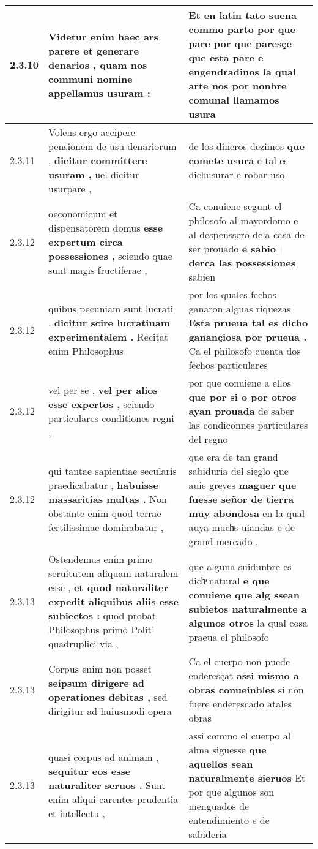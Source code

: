 \begin{tabular}{|p{1cm}|p{6.5cm}|p{6.5cm}|}
2.3.10 & Videtur enim haec ars parere \textbf{ et generare denarios , } quam nos communi nomine appellamus usuram : & Et en latin tato suena commo parto \textbf{ por que pare por que paresçe que esta pare e engendradinos la qual arte nos } por nonbre comunal llamamos usura \\\hline
2.3.11 & Volens ergo accipere pensionem de usu denariorum , \textbf{ dicitur committere usuram , } uel dicitur usurpare , & de los dineros dezimos \textbf{ que comete usura } e tal es dichusurar e robar uso \\\hline
2.3.12 & oeconomicum et dispensatorem domus \textbf{ esse expertum circa possessiones , } sciendo quae sunt magis fructiferae , & Ca conuiene segunt el philosofo al mayordomo e al despenssero dela casa de ser prouado \textbf{ e sabio | derca las possessiones } sabien \\\hline
2.3.12 & quibus pecuniam sunt lucrati , \textbf{ dicitur scire lucratiuam experimentalem . } Recitat enim Philosophus & por los quales fechos ganaron alguas riquezas \textbf{ Esta prueua tal es dicho ganançiosa por prueua . } Ca el philosofo cuenta dos fechos particulares \\\hline
2.3.12 & vel per se , \textbf{ vel per alios esse expertos , } sciendo particulares conditiones regni , & por que conuiene a ellos \textbf{ que por si o por otros ayan prouada } de saber las condiconnes particulares del regno \\\hline
2.3.12 & qui tantae sapientiae secularis praedicabatur , \textbf{ habuisse massaritias multas . } Non obstante enim quod terrae fertilissimae dominabatur , & que era de tan grand sabiduria del sieglo que auie greyes \textbf{ maguer que fuesse señor de tierra muy abondosa } en la qual auya muchͣs uiandas e de grand mercado . \\\hline
2.3.13 & Ostendemus enim primo seruitutem aliquam naturalem esse , \textbf{ et quod naturaliter expedit aliquibus aliis esse subiectos : } quod probat Philosophus primo Polit’ quadruplici via , & que alguna suidunbre es dichͣ natural \textbf{ e que conuiene que alg ssean subietos naturalmente a algunos otros } la qual cosa praeua el philosofo \\\hline
2.3.13 & Corpus enim non posset \textbf{ seipsum dirigere ad operationes debitas , } sed dirigitur ad huiusmodi opera & Ca el cuerpo non puede enderesçat \textbf{ assi mismo a obras conueinbles } si non fuere enderescado atales obras \\\hline
2.3.13 & quasi corpus ad animam , \textbf{ sequitur eos esse naturaliter seruos . } Sunt enim aliqui carentes prudentia et intellectu , & assi commo el cuerpo al alma siguesse \textbf{ que aquellos sean naturalmente sieruos } Et por que algunos son menguados de entendimiento e de sabideria \\\hline

\end{tabular}
